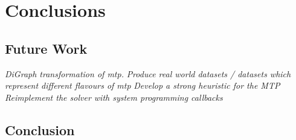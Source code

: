 \makeatletter
\def\toclevel@chapter{-1}
\makeatother
\chapter{Conclusions}

\section{Future Work}

\textit{DiGraph transformation of \gls{mtp}.}
\textit{Produce real world datasets / datasets which represent different flavours of mtp}
\textit{Develop a strong heuristic for the MTP}
\textit{Reimplement the solver with system programming callbacks}

\section{Conclusion}


